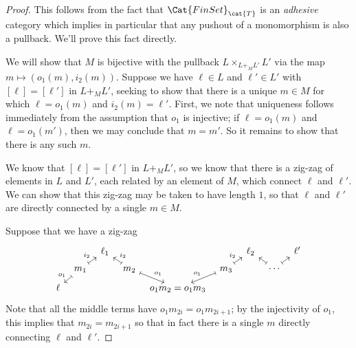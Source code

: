 \documentclass[DynamicalBook]{subfiles}
\begin{document}
  \begin{proof}
This follows from the fact that $\Cat{FinSet}_{\cat{T}}$ is an \emph{adhesive} category which implies in particular that any pushout of a monomorphism is also a pullback. We'll prove this fact directly.

We will show that $M$ is bijective with the pullback $L \times_{L+_{M}L'} L'$ via the map $m \mapsto (o_{1}(m), i_{2}(m))$. Suppose we have $\ell \in L$ and $\ell' \in L'$ with $[\ell] = [\ell']$ in $L +_{M} L'$, seeking to show that there is a unique $m \in M$ for which $\ell = o_{1}(m)$ and $i_{2}(m) = \ell'$. First, we note that uniqueness follows immediately from the assumption that $o_{1}$ is injective; if $\ell = o_{1}(m)$ and $\ell = o_{1}(m')$, then we may conclude that $m = m'$. So it remains to show that there is any such $m$.

We know that $[\ell] = [\ell']$ in $L +_{M} L'$, so we know that there is a zig-zag of elements in $L$ and $L'$, each related by an element of $M$, which connect $\ell$ and $\ell'$. We can show that this zig-zag may be taken to have length $1$, so that $\ell$ and $\ell'$ are directly connected by a single $m \in M$.

Suppose that we have a zig-zag
\[
\begin{tikzcd}[sep = tiny]
	&& {\ell_1} &&&& {\ell_2} && {\ell'} \\
	& {m_1} && {m_2} && {m_3} && \cdots  \\
	\ell &&&& {o_{1}m_2 = o_{1}m_3} &&&&
	\arrow["{o_{1}}"', maps to, from=2-2, to=3-1]
	\arrow["{i_{2}}", maps to, from=2-2, to=1-3]
	\arrow["{i_{2}}"', maps to, from=2-4, to=1-3]
	\arrow["{o_{1}}", maps to, from=2-4, to=3-5]
	\arrow["{o_{1}}"', maps to, from=2-6, to=3-5]
	\arrow["{i_{2}}", maps to, from=2-6, to=1-7]
	\arrow[maps to, from=2-8, to=1-7]
	\arrow[maps to, from=2-8, to=1-9]
\end{tikzcd}
\]
Note that all the middle terms have $o_{1}m_{2i} = o_{1}m_{2i+1}$; by the injectivity of $o_{1}$, this implies that $m_{2i} = m_{2i+1}$ so that in fact there is a single $m$ directly connecting $\ell$ and $\ell'$.
    \end{proof}
\end{document}
